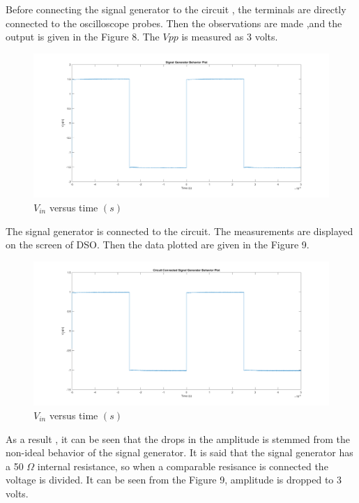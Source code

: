 \documentclass[letterpaper,12pt]{article}
\begin{document}
Before connecting the signal generator to the circuit , the terminals are directly connected to the oscilloscope probes. Then the observations are made ,and the output is given in the Figure 8. The \(V{pp}\) is measured as 3 volts.

\begin{figure}[H]
	\centering
   \includegraphics[width=1\textwidth]{3a.png}
   \caption{\(V_{in}\) versus time \((s)\) }
\end{figure}  

The signal generator is connected to the circuit. The measurements are displayed on the screen of DSO. Then the data  plotted are given in the Figure 9.
\begin{figure}[H]
	\centering
   \includegraphics[width=1\textwidth]{3b.png}
   \caption{\(V_{in}\) versus time \((s)\) }
\end{figure}  
As a result , it can  be seen that the drops in the amplitude is stemmed from the non-ideal behavior of the signal generator. It is said that the signal generator has a 50 \(\Omega\)  internal resistance, so when a comparable resisance is connected the voltage is divided. It can be seen from the Figure 9, amplitude is dropped to 3 volts.
\end{document}
